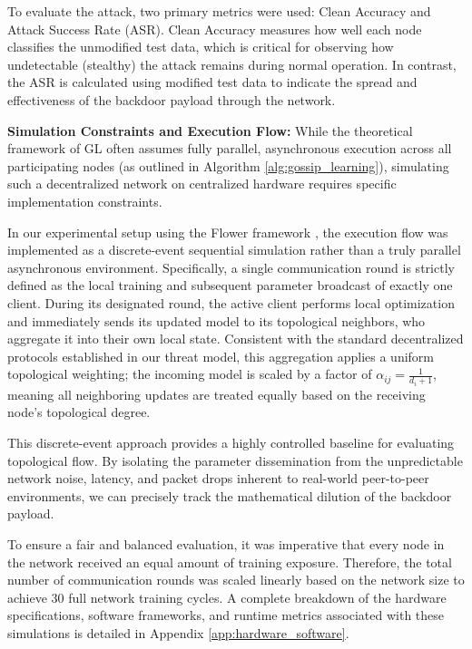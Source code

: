 To evaluate the attack, two primary metrics were used: Clean Accuracy and Attack Success Rate (ASR). Clean Accuracy measures how well each node classifies the unmodified test data, which is critical for observing how undetectable (stealthy) the attack remains during normal operation. In contrast, the ASR is calculated using modified test data to indicate the spread and effectiveness of the backdoor payload through the network.

\textbf{Simulation Constraints and Execution Flow:}
While the theoretical framework of GL often assumes fully parallel, asynchronous execution across all participating nodes (as outlined in Algorithm \ref{alg:gossip_learning}), simulating such a decentralized network on centralized hardware requires specific implementation constraints.

In our experimental setup using the Flower framework \cite{beutel2020flower}, the execution flow was implemented as a discrete-event sequential simulation rather than a truly parallel asynchronous environment. Specifically, a single communication round is strictly defined as the local training and subsequent parameter broadcast of exactly one client. During its designated round, the active client performs local optimization and immediately sends its updated model to its topological neighbors, who aggregate it into their own local state. Consistent with the standard decentralized protocols established in our threat model, this aggregation applies a uniform topological weighting; the incoming model is scaled by a factor of $\alpha_{ij} = \frac{1}{d_i + 1}$, meaning all neighboring updates are treated equally based on the receiving node's topological degree.

This discrete-event approach provides a highly controlled baseline for evaluating topological flow. By isolating the parameter dissemination from the unpredictable network noise, latency, and packet drops inherent to real-world peer-to-peer environments, we can precisely track the mathematical dilution of the backdoor payload. 

To ensure a fair and balanced evaluation, it was imperative that every node in the network received an equal amount of training exposure. Therefore, the total number of communication rounds was scaled linearly based on the network size to achieve 30 full network training cycles. A complete breakdown of the hardware specifications, software frameworks, and runtime metrics associated with these simulations is detailed in Appendix \ref{app:hardware_software}.

